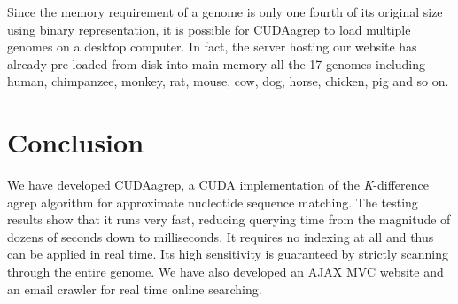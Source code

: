 Since the memory requirement of a genome is only one fourth of its original size using binary representation, it is possible for CUDAagrep to load multiple genomes on a desktop computer. In fact, the server hosting our website has already pre-loaded from disk into main memory all the 17 genomes including human, chimpanzee, monkey, rat, mouse, cow, dog, horse, chicken, pig and so on.

\section{Conclusion}

We have developed CUDAagrep, a CUDA implementation of the \textit{K}-difference agrep algorithm for approximate nucleotide sequence matching. The testing results show that it runs very fast, reducing querying time from the magnitude of dozens of seconds down to milliseconds. It requires no indexing at all and thus can be applied in real time. Its high sensitivity is guaranteed by strictly scanning through the entire genome. We have also developed an AJAX MVC website and an email crawler for real time online searching.

\chapterend
